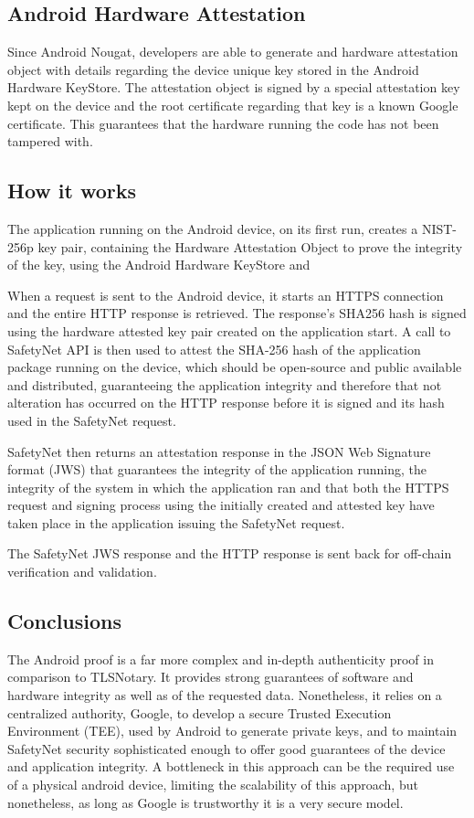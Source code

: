 \subsection{Android Hardware Attestation}
Since Android Nougat, developers are able to generate and hardware attestation object with details regarding the device unique key stored in the Android Hardware KeyStore. The attestation object is signed by a special attestation key kept on the device and the root certificate regarding that key is a known Google certificate. This guarantees that the hardware running the code has not been tampered with.

\subsection{How it works}
The application running on the Android device, on its first run, creates a NIST-256p key pair, containing the Hardware Attestation Object to prove the integrity of the key, using the Android Hardware KeyStore and 

When a request is sent to the Android device, it starts an HTTPS connection and the entire HTTP response is retrieved. The response's SHA256 hash is signed using the hardware attested key pair created on the application start. A call to SafetyNet API is then used to attest the SHA-256 hash of the application package running on the device, which should be open-source and public available and distributed, guaranteeing the application integrity and therefore that not alteration has occurred on the HTTP response before it is signed and its hash used in the SafetyNet request.

SafetyNet then returns an attestation response in the JSON Web Signature format (JWS) that guarantees the integrity of the application running, the integrity of the system in which the application ran and that both the HTTPS request and signing process using the initially created and attested key have taken place in the application issuing the SafetyNet request.

The SafetyNet JWS response and the HTTP response is sent back for off-chain verification and validation.

\subsection{Conclusions}
The Android proof is a far more complex and in-depth authenticity proof in comparison to TLSNotary. It provides strong guarantees of software and hardware integrity as well as of the requested data. Nonetheless, it relies on a centralized authority, Google, to develop a secure Trusted Execution Environment (TEE), used by Android to generate private keys, and to maintain SafetyNet security sophisticated enough to offer good guarantees of the device and application integrity. A bottleneck in this approach can be the required use of a physical android device, limiting the scalability of this approach, but nonetheless, as long as Google is trustworthy it is a very secure model. 


